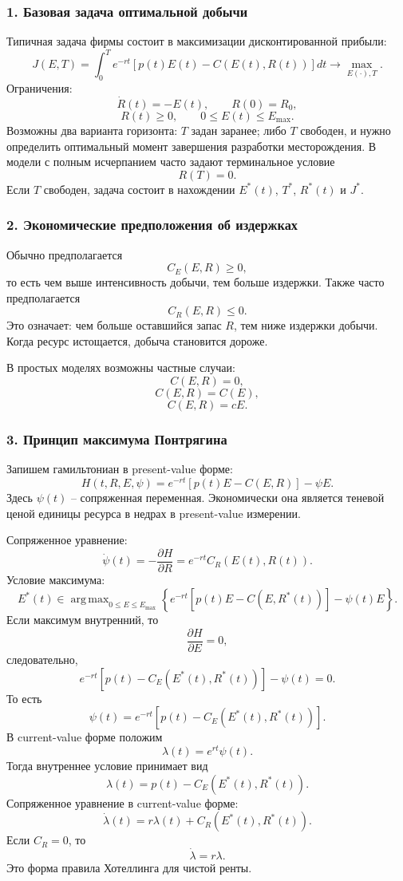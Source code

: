 \documentclass[12pt,a4paper]{article}
\DeclareMathOperator*{\argmax}{arg\,max}
\begin{document}
\subsubsection*{1. Базовая задача оптимальной добычи}
Типичная задача фирмы состоит в максимизации дисконтированной прибыли:
\[
J(E,T)=\int_0^T e^{-rt}\left[p(t)E(t)-C(E(t),R(t))\right]dt\to \max_{E(\cdot),T}.
\]
Ограничения:
\[
\dot R(t)=-E(t),\qquad R(0)=R_0,
\]
\[
R(t)\ge 0,
\qquad
0\le E(t)\le E_{\max}.
\]
Возможны два варианта горизонта: $T$ задан заранее; либо $T$ свободен, и нужно определить оптимальный момент завершения разработки месторождения. В модели с полным исчерпанием часто задают терминальное условие
\[
R(T)=0.
\]
Если $T$ свободен, задача состоит в нахождении $E^*(t)$, $T^*$, $R^*(t)$ и $J^*$.

\subsubsection*{2. Экономические предположения об издержках}
Обычно предполагается
\[
C_E(E,R)\ge 0,
\]
то есть чем выше интенсивность добычи, тем больше издержки. Также часто предполагается
\[
C_R(E,R)\le 0.
\]
Это означает: чем больше оставшийся запас $R$, тем ниже издержки добычи. Когда ресурс истощается, добыча становится дороже.

В простых моделях возможны частные случаи:
\[
C(E,R)=0,
\]
\[
C(E,R)=C(E),
\]
\[
C(E,R)=cE.
\]

\subsubsection*{3. Принцип максимума Понтрягина}
Запишем гамильтониан в present-value форме:
\[
H(t,R,E,\psi)=e^{-rt}\left[p(t)E-C(E,R)\right]-\psi E.
\]
Здесь $\psi(t)$ -- сопряженная переменная. Экономически она является теневой ценой единицы ресурса в недрах в present-value измерении.

Сопряженное уравнение:
\[
\dot\psi(t)=-\frac{\partial H}{\partial R}=e^{-rt}C_R(E(t),R(t)).
\]
Условие максимума:
\[
E^*(t)\in \argmax_{0\le E\le E_{\max}}\left\{e^{-rt}[p(t)E-C(E,R^*(t))]-\psi(t)E\right\}.
\]
Если максимум внутренний, то
\[
\frac{\partial H}{\partial E}=0,
\]
следовательно,
\[
e^{-rt}\left[p(t)-C_E(E^*(t),R^*(t))\right]-\psi(t)=0.
\]
То есть
\[
\psi(t)=e^{-rt}\left[p(t)-C_E(E^*(t),R^*(t))\right].
\]
В current-value форме положим
\[
\lambda(t)=e^{rt}\psi(t).
\]
Тогда внутреннее условие принимает вид
\[
\lambda(t)=p(t)-C_E(E^*(t),R^*(t)).
\]
Сопряженное уравнение в current-value форме:
\[
\dot\lambda(t)=r\lambda(t)+C_R(E^*(t),R^*(t)).
\]
Если $C_R=0$, то
\[
\dot\lambda=r\lambda.
\]
Это форма правила Хотеллинга для чистой ренты.
\end{document}
